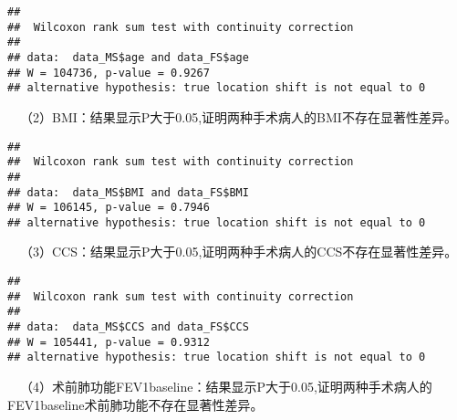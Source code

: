 \documentclass[
]{article}
\newenvironment{Shaded}{\begin{snugshade}}{\end{snugshade}}
\newcommand{\FunctionTok}[1]{\textcolor[rgb]{0.00,0.00,0.00}{#1}}
\newcommand{\NormalTok}[1]{#1}
\newcommand{\SpecialCharTok}[1]{\textcolor[rgb]{0.00,0.00,0.00}{#1}}
\begin{document}
\begin{Shaded}
\end{Shaded}

\begin{verbatim}
## 
##  Wilcoxon rank sum test with continuity correction
## 
## data:  data_MS$age and data_FS$age
## W = 104736, p-value = 0.9267
## alternative hypothesis: true location shift is not equal to 0
\end{verbatim}

 （2）BMI：结果显示P大于0.05,证明两种手术病人的BMI不存在显著性差异。

\begin{Shaded}
\end{Shaded}

\begin{verbatim}
## 
##  Wilcoxon rank sum test with continuity correction
## 
## data:  data_MS$BMI and data_FS$BMI
## W = 106145, p-value = 0.7946
## alternative hypothesis: true location shift is not equal to 0
\end{verbatim}

 （3）CCS：结果显示P大于0.05,证明两种手术病人的CCS不存在显著性差异。

\begin{Shaded}
\end{Shaded}

\begin{verbatim}
## 
##  Wilcoxon rank sum test with continuity correction
## 
## data:  data_MS$CCS and data_FS$CCS
## W = 105441, p-value = 0.9312
## alternative hypothesis: true location shift is not equal to 0
\end{verbatim}

 （4）术前肺功能FEV1baseline：结果显示P大于0.05,证明两种手术病人的FEV1baseline术前肺功能不存在显著性差异。
\end{document}
